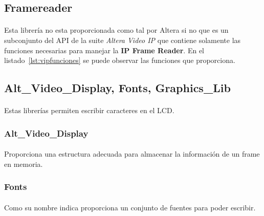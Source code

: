 \documentclass[a4paper,12pt,titlepage,final]{book}
\begin{document}






\subsection{Framereader}
\paragraph{}
Esta librería no esta proporcionada como tal por Altera si no que es un subconjunto del API de la suite \textit{Altera Video IP} que contiene solamente las funciones necesarias para manejar la \textbf{IP Frame Reader}. En el listado~\ref{lst:vipfunciones} se puede observar las funciones que proporciona.



\subsection{Alt\_Video\_Display, Fonts, Graphics\_Lib}
\paragraph{}
Estas librerías permiten escribir caracteres en el LCD. 

\subsubsection{Alt\_Video\_Display}
\paragraph{}
Proporciona una estructura adecuada para almacenar la información de un frame en memoria.

\subsubsection{Fonts}
\paragraph{}
Como su nombre indica proporciona un conjunto de fuentes para poder escribir.
\end{document}
